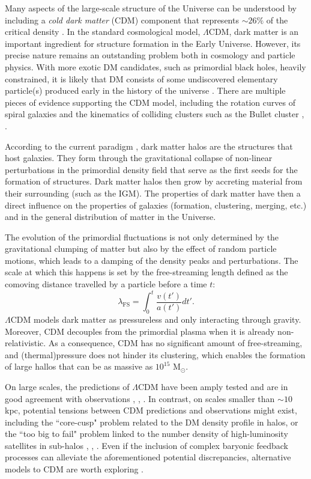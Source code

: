 Many aspects of the large-scale structure of the Universe can be understood by including a \emph{cold dark matter} (CDM) component that represents $\sim 26 \%$ of the critical density \cite{planck2014}. In the standard cosmological model, $\Lambda$CDM, dark matter is an important ingredient for structure formation in the Early Universe. However, its precise nature remains an outstanding problem both in cosmology and particle physics. With more exotic DM candidates, such as primordial black holes, heavily constrained, it is likely that DM consists of some undiscovered elementary particle(s) produced early in the history of the universe \cite{Villanueva_Domingo_2021}. There are multiple pieces of evidence supporting the CDM model, including the rotation curves of spiral galaxies and the kinematics of colliding clusters such as the Bullet cluster \cite{Navarro1996}, \cite{de_Blok_2008}.

According to the current paradigm \cite{Mo2010}, dark matter halos are the structures that host galaxies. They form through the gravitational collapse of non-linear perturbations in the primordial density field that serve as the first seeds for the formation of structures. Dark matter halos then grow by accreting material from their surrounding (such as the IGM). The properties of dark matter have then a direct influence on the properties of galaxies (formation, clustering, merging, etc.) and in the general distribution of matter in the Universe.

The evolution of the primordial fluctuations is not only determined by the gravitational clumping of matter but also by
the effect of random particle motions, which leads to a damping of the density peaks and perturbations. The scale at which this happens is set by the free-streaming length defined as the comoving distance travelled by a particle before a time $t$:
\begin{equation}
    \lambda_\mathrm{FS}=\int_0^t\frac{v(t')}{a(t')}dt'.
\end{equation}
$\Lambda$CDM models dark matter as pressureless and only interacting through gravity. Moreover, CDM decouples from the primordial plasma when it is already non-relativistic.
As a consequence, CDM has no significant amount of free-streaming, and (thermal)pressure does not hinder its clustering, which enables the formation of large hallos that can be as massive as $10^15$ M$_\odot$.

On large scales, the predictions of $\Lambda$CDM have been amply tested and are in good agreement with observations \cite{Dalal2002}, \cite{VanWaerbeke2004}, \cite{Eisenstein2005}. In contrast, on scales smaller than $\sim 10$ kpc, potential tensions between CDM predictions and observations might exist, including the ``core-cusp" problem related to the DM density profile in halos, or the ``too big to fail" problem linked to the number density of high-luminosity satellites in sub-halos \cite{Moore1994}, \cite{Boylan_Kolchin_2011}, \cite{Weinberg_2015}. Even if the inclusion of complex baryonic feedback processes can alleviate the aforementioned potential discrepancies, alternative models to CDM are worth exploring \cite{Vogelsberger2014}.  

